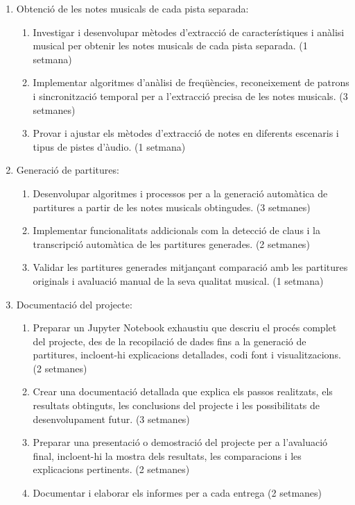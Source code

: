 \documentclass[10pt,a4paper,twocolumn,twoside]{article}
\begin{document}
\begin{enumerate}
    \item Obtenció de les notes musicals de cada pista separada:
    \begin{enumerate}
        \item Investigar i desenvolupar mètodes d'extracció de característiques i anàlisi musical per obtenir les notes musicals de cada pista separada. (1 setmana)
        \item Implementar algoritmes d'anàlisi de freqüències, reconeixement de patrons i sincronització temporal per a l'extracció precisa de les notes musicals. (3 setmanes)
        \item Provar i ajustar els mètodes d'extracció de notes en diferents escenaris i tipus de pistes d'àudio. (1 setmana)
    \end{enumerate}
    
    \item Generació de partitures:
    \begin{enumerate}
        \item Desenvolupar algoritmes i processos per a la generació automàtica de partitures a partir de les notes musicals obtingudes. (3 setmanes)
        \item Implementar funcionalitats addicionals com la detecció de claus i la transcripció automàtica de les partitures generades. (2 setmanes)
        \item Validar les partitures generades mitjançant comparació amb les partitures originals i avaluació manual de la seva qualitat musical. (1 setmana)
    \end{enumerate}
    \item Documentació del projecte:
    \begin{enumerate}
        \item Preparar un Jupyter Notebook exhaustiu que descriu el procés complet del projecte, des de la recopilació de dades fins a la generació de partitures, incloent-hi explicacions detallades, codi font i visualitzacions. (2 setmanes)
        \item Crear una documentació detallada que explica els passos realitzats, els resultats obtinguts, les conclusions del projecte i les possibilitats de desenvolupament futur. (3 setmanes)
        \item Preparar una presentació o demostració del projecte per a l'avaluació final, incloent-hi la mostra dels resultats, les comparacions i les explicacions pertinents. (2 setmanes)
        \item Documentar i elaborar els informes per a cada entrega (2 setmanes)
    \end{enumerate}
\end{enumerate}
\end{document}
